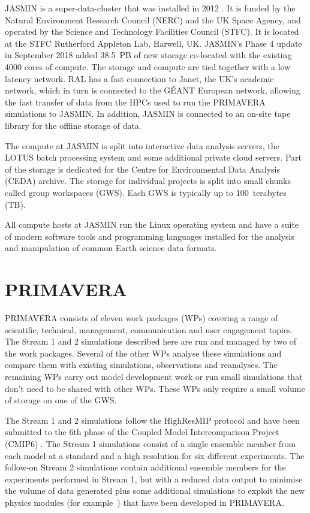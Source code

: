 \documentclass[gmd, manuscript]{copernicus}
\begin{document}
JASMIN is a super-data-cluster that was installed in 2012 \citep{lawrence2013storing}. It is funded by the Natural Environment Research Council (NERC) and the UK Space Agency, and operated by the Science and Technology Facilities Council (STFC). It is located at the STFC Rutherford Appleton Lab, Harwell, UK. JASMIN's Phase 4 update in September 2018 added 38.5~PB of new storage co-located with the existing 4000 cores of compute. The storage and compute are tied together with a low latency network. RAL has a fast connection to Janet, the UK's academic network, which in turn is connected to the G\'{E}ANT European network, allowing the fast transfer of data from the HPCs used to run the PRIMAVERA simulations to JASMIN. In addition, JASMIN is connected to an on-site tape library for the offline storage of data.

The compute at JASMIN is split into interactive data analysis servers, the LOTUS batch processing system and some additional private cloud servers. Part of the storage is dedicated for the Centre for Environmental Data Analysis (CEDA) archive. The storage for individual projects is split into small chunks called group workspaces (GWS). Each GWS is typically up to 100~terabytes (TB).

All compute hosts at JASMIN run the Linux operating system and have a suite of modern software tools and programming languages installed for the analysis and manipulation of common Earth science data formats.

\section{PRIMAVERA}

PRIMAVERA consists of eleven work packages (WPs) covering a range of scientific, technical, management, communication and user engagement topics. The Stream 1 and 2 simulations described here are run and managed by two of the work packages. Several of the other WPs analyse these simulations and compare them with existing simulations, observations and reanalyses. The remaining WPs carry out model development work or run small simulations that don't need to be shared with other WPs. These WPs only require a small volume of storage on one of the GWS.

The Stream 1 and 2 simulations follow the HighResMIP protocol and have been submitted to the 6th phase of the Coupled Model Intercomparison Project (CMIP6) \citep{Eyring2016}. The Stream 1 simulations consist of a single ensemble member from each model at a standard and a high resolution for six different experiments. The follow-on Stream 2 simulations contain additional ensemble members for the experiments performed in Stream 1, but with a reduced data output to minimise the volume of data generated plus some additional simulations to exploit the new physics modules (for example~\citep{Nurser2020}) that have been developed in PRIMAVERA.
\end{document}
